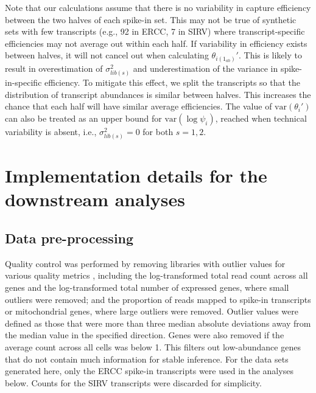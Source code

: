 \documentclass{article}
\begin{document}
Note that our calculations assume that there is no variability in capture efficiency between the two halves of each spike-in set.
This may not be true of synthetic sets with few transcripts (e.g., 92 in ERCC, 7 in SIRV) where transcript-specific efficiencies may not average out within each half.
If variability in efficiency exists between halves, it will not cancel out when calculating $\theta_{i(1_{ab})}'$.
This is likely to result in overestimation of $\sigma^2_{lib(s)}$ and underestimation of the variance in spike-in-specific efficiency.
To mitigate this effect, we split the transcripts so that the distribution of transcript abundances is similar between halves.
This increases the chance that each half will have similar average efficiencies.
The value of $\mbox{var}(\theta_i')$ can also be treated as an upper bound for $\mbox{var}(\log \psi_i)$, reached when technical variability is absent, i.e., $\sigma^2_{lib(s)}=0$ for both $s=1,2$.


\section{Implementation details for the downstream analyses}

\subsection{Data pre-processing}
Quality control was performed by removing libraries with outlier values for various quality metrics \cite{lun2016step}, including 
the log-transformed total read count across all genes and the log-transformed total number of expressed genes, where small outliers were removed; 
and the proportion of reads mapped to spike-in transcripts or mitochondrial genes, where large outliers were removed.
Outlier values were defined as those that were more than three median absolute deviations away from the median value in the specified direction.
Genes were also removed if the average count across all cells was below 1.
This filters out low-abundance genes that do not contain much information for stable inference.
For the data sets generated here, only the ERCC spike-in transcripts were used in the analyses below.
Counts for the SIRV transcripts were discarded for simplicity.
\end{document}
